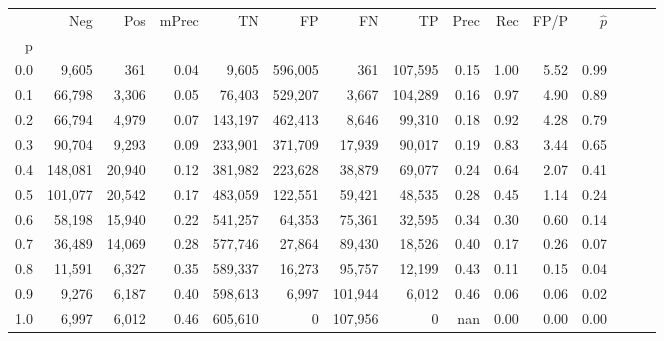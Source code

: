 \begin{tabular}{rrrrrrrrrrrrrrr}
\toprule
{} &      Neg &     Pos & mPrec &       TN &       FP &       FN &       TP &  Prec &   Rec &  FP/P & $\hat{p}$ \\
p   &          &         &       &          &          &          &          &       &       &       &           \\
\midrule
0.0 &    9,605 &     361 &  0.04 &    9,605 &  596,005 &      361 &  107,595 &  0.15 &  1.00 &  5.52 &      0.99 \\
0.1 &   66,798 &   3,306 &  0.05 &   76,403 &  529,207 &    3,667 &  104,289 &  0.16 &  0.97 &  4.90 &      0.89 \\
0.2 &   66,794 &   4,979 &  0.07 &  143,197 &  462,413 &    8,646 &   99,310 &  0.18 &  0.92 &  4.28 &      0.79 \\
0.3 &   90,704 &   9,293 &  0.09 &  233,901 &  371,709 &   17,939 &   90,017 &  0.19 &  0.83 &  3.44 &      0.65 \\
0.4 &  148,081 &  20,940 &  0.12 &  381,982 &  223,628 &   38,879 &   69,077 &  0.24 &  0.64 &  2.07 &      0.41 \\
0.5 &  101,077 &  20,542 &  0.17 &  483,059 &  122,551 &   59,421 &   48,535 &  0.28 &  0.45 &  1.14 &      0.24 \\
0.6 &   58,198 &  15,940 &  0.22 &  541,257 &   64,353 &   75,361 &   32,595 &  0.34 &  0.30 &  0.60 &      0.14 \\
0.7 &   36,489 &  14,069 &  0.28 &  577,746 &   27,864 &   89,430 &   18,526 &  0.40 &  0.17 &  0.26 &      0.07 \\
0.8 &   11,591 &   6,327 &  0.35 &  589,337 &   16,273 &   95,757 &   12,199 &  0.43 &  0.11 &  0.15 &      0.04 \\
0.9 &    9,276 &   6,187 &  0.40 &  598,613 &    6,997 &  101,944 &    6,012 &  0.46 &  0.06 &  0.06 &      0.02 \\
1.0 &    6,997 &   6,012 &  0.46 &  605,610 &        0 &  107,956 &        0 &   nan &  0.00 &  0.00 &      0.00 \\
\bottomrule
\end{tabular}
